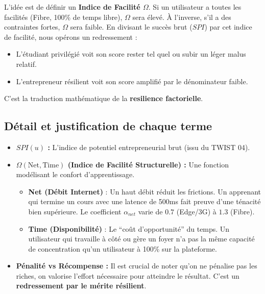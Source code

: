 \documentclass[11pt,a4paper]{article}
\begin{document}
L'idée est de définir un \textbf{Indice de Facilité $\Omega$}. Si un utilisateur a toutes les facilités (Fibre, 100\% de temps libre), $\Omega$ sera élevé. À l'inverse, s'il a des contraintes fortes, $\Omega$ sera faible. En divisant le succès brut ($SPI$) par cet indice de facilité, nous opérons un redressement :
\begin{itemize}
    \item L'étudiant privilégié voit son score rester tel quel ou subir un léger malus relatif.
    \item L'entrepreneur résilient voit son score amplifié par le dénominateur faible.
\end{itemize}
C'est la traduction mathématique de la \textbf{resilience factorielle}.

\subsection{Détail et justification de chaque terme}
\begin{itemize}
    \item \textbf{$SPI(u)$ :} L'indice de potentiel entrepreneurial brut (issu du TWIST 04).
    
    \item \textbf{$\Omega(\text{Net}, \text{Time})$ (Indice de Facilité Structurelle) :} 
    Une fonction modélisant le confort d'apprentissage. 
    \begin{itemize}
        \item \textbf{Net (Débit Internet)} : Un haut débit réduit les frictions. Un apprenant qui termine un cours avec une latence de 500ms fait preuve d'une ténacité bien supérieure. Le coefficient $\alpha_{net}$ varie de $0.7$ (Edge/3G) à $1.3$ (Fibre).
        \item \textbf{Time (Disponibilité)} : Le ``coût d'opportunité'' du temps. Un utilisateur qui travaille à côté ou gère un foyer n'a pas la même capacité de concentration qu'un utilisateur à 100\% sur la plateforme.
    \end{itemize}
    
    \item \textbf{Pénalité vs Récompense :} Il est crucial de noter qu'on ne pénalise pas les riches, on valorise l'effort nécessaire pour atteindre le résultat. C'est un \textbf{redressement par le mérite résilient}.
\end{itemize}
\end{document}
